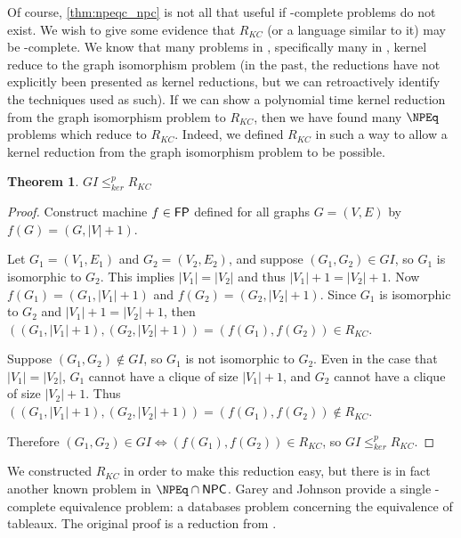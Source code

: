 \documentclass{article}
\newtheorem{theorem}{Theorem}[section]
\theoremstyle{definition} \newtheorem{definition}[definition]{Definition}
\newcommand{\kr}{\leq^{p}_{ker}} %
\begin{document}
Of course, \autoref{thm:npeqc_npc} is not all that useful if \NPEq-complete
problems do not exist. We wish to give some evidence that $R_{KC}$ (or a
language similar to it) may be \NPEq-complete. We know that many problems in
\NP, specifically many in \NPEq, kernel reduce to the graph isomorphism problem
(in the past, the reductions have not explicitly been presented as kernel
reductions, but we can retroactively identify the techniques used as such). If
we can show a polynomial time kernel reduction from the graph isomorphism
problem to $R_{KC}$, then we have found many $\NPEq$ problems which reduce to
$R_{KC}$. Indeed, we defined $R_{KC}$ in such a way to allow a kernel reduction
from the graph isomorphism problem to be possible.

\begin{theorem}$GI\kr R_{KC}$\end{theorem}
\begin{proof}
  Construct machine $f\in{\ensuremath{\mathsf{FP}}}$ defined for all graphs $G=(V,E)$ by
  $f(G)=(G,|V|+1)$.

  Let $G_1=(V_1, E_1)$ and $G_2=(V_2, E_2)$, and suppose $(G_1, G_2)\in GI$, so
  $G_1$ is isomorphic to $G_2$. This implies $|V_1|=|V_2|$ and thus
  $|V_1|+1=|V_2|+1$. Now $f(G_1)=(G_1, |V_1|+1)$ and $f(G_2)=(G_2,
  |V_2|+1)$. Since $G_1$ is isomorphic to $G_2$ and $|V_1|+1=|V_2|+1$, then
  $((G_1, |V_1|+1),(G_2, |V_2|+1))=(f(G_1), f(G_2))\in R_{KC}$.
  
  Suppose $(G_1, G_2)\notin GI$, so $G_1$ is not isomorphic to $G_2$. Even in
  the case that $|V_1|=|V_2|$, $G_1$ cannot have a clique of size $|V_1|+1$,
  and $G_2$ cannot have a clique of size $|V_2|+1$. Thus $((G_1, |V_1|+1),
  (G_2, |V_2|+1))=(f(G_1), f(G_2))\notin R_{KC}$.

  Therefore $(G_1, G_2)\in GI\iff (f(G_1), f(G_2))\in R_{KC}$, so $GI\kr
  R_{KC}$.
\end{proof}

We constructed $R_{KC}$ in order to make this reduction easy, but there is in
fact another known problem in $\NPEq\cap\NPC$. Garey and Johnson provide a
single \NP-complete equivalence problem: a databases problem concerning the
equivalence of tableaux.\cite{gj79} The original proof is a reduction from
\TSAT.\cite{asu79}
\end{document}
